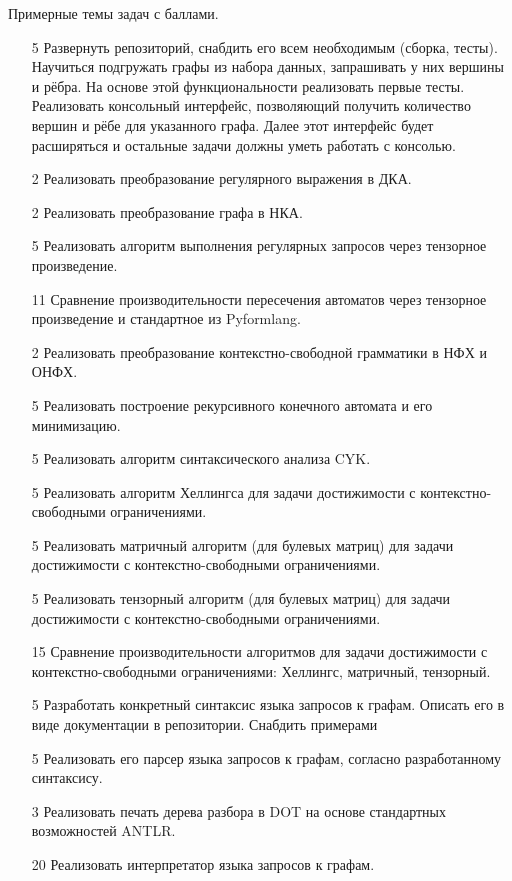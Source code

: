Примерные темы задач с баллами.
\begin{enumerate}
  \item [5] Развернуть репозиторий, снабдить его всем необходимым (сборка, тесты). Научиться подгружать графы из набора данных, запрашивать у них вершины и рёбра. На основе этой функциональности реализовать первые тесты. Реализовать консольный интерфейс, позволяющий получить количество вершин и рёбе для указанного графа. Далее этот интерфейс будет расширяться и остальные задачи должны уметь работать с консолью. 
  \item [2] Реализовать преобразование регулярного выражения в ДКА. 
  \item [2] Реализовать преобразование графа в НКА.
  \item [5] Реализовать алгоритм выполнения регулярных запросов через тензорное произведение. 
  \item [11] Сравнение производительности пересечения автоматов через тензорное произведение и стандартное из Pyformlang.
  \item [2] Реализовать преобразование контекстно-свободной грамматики в НФХ и ОНФХ. 
  \item [5] Реализовать построение рекурсивного конечного автомата и его минимизацию.
  \item [5] Реализовать алгоритм синтаксического анализа CYK.
  \item [5] Реализовать алгоритм Хеллингса для задачи достижимости с контекстно-свободными ограничениями.
  \item [5] Реализовать матричный алгоритм (для булевых матриц) для задачи достижимости с контекстно-свободными ограничениями.
  \item [5] Реализовать тензорный алгоритм (для булевых матриц) для задачи достижимости с контекстно-свободными ограничениями.
  \item [15] Сравнение производительности алгоритмов для задачи достижимости с контекстно-свободными ограничениями: Хеллингс, матричный, тензорный.
  \item [5] Разработать конкретный синтаксис языка запросов к графам. Описать его в виде документации в репозитории. Снабдить примерами
  \item [5] Реализовать его парсер языка запросов к графам, согласно разработанному синтаксису.
  \item [3] Реализовать печать дерева разбора в DOT на основе стандартных возможностей ANTLR.
  \item [20] Реализовать интерпретатор языка запросов к графам.
\end{enumerate}